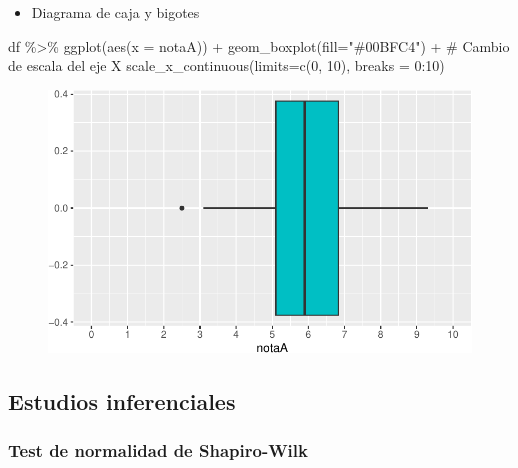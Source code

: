 \documentclass[
  a4paper,
]{scrreport}
\newenvironment{Shaded}{\begin{snugshade}}{\end{snugshade}}
\newcommand{\AttributeTok}[1]{\textcolor[rgb]{0.40,0.45,0.13}{#1}}
\newcommand{\CommentTok}[1]{\textcolor[rgb]{0.37,0.37,0.37}{#1}}
\newcommand{\DecValTok}[1]{\textcolor[rgb]{0.68,0.00,0.00}{#1}}
\newcommand{\FunctionTok}[1]{\textcolor[rgb]{0.28,0.35,0.67}{#1}}
\newcommand{\NormalTok}[1]{\textcolor[rgb]{0.00,0.23,0.31}{#1}}
\newcommand{\SpecialCharTok}[1]{\textcolor[rgb]{0.37,0.37,0.37}{#1}}
\newcommand{\StringTok}[1]{\textcolor[rgb]{0.13,0.47,0.30}{#1}}
\providecommand{\tightlist}{%
  \setlength{\itemsep}{0pt}\setlength{\parskip}{0pt}}\usepackage{longtable,booktabs,array}
\theoremstyle{definition}
\theoremstyle{definition}
\theoremstyle{remark}
\begin{document}
\begin{itemize}
\tightlist
\item
  Diagrama de caja y bigotes
\end{itemize}

\begin{Shaded}
\begin{Highlighting}[]
\NormalTok{df }\SpecialCharTok{\%\textgreater{}\%} \FunctionTok{ggplot}\NormalTok{(}\FunctionTok{aes}\NormalTok{(}\AttributeTok{x =}\NormalTok{ notaA)) }\SpecialCharTok{+} 
  \FunctionTok{geom\_boxplot}\NormalTok{(}\AttributeTok{fill=}\StringTok{"\#00BFC4"}\NormalTok{) }\SpecialCharTok{+}
  \CommentTok{\# Cambio de escala del eje X}
  \FunctionTok{scale\_x\_continuous}\NormalTok{(}\AttributeTok{limits=}\FunctionTok{c}\NormalTok{(}\DecValTok{0}\NormalTok{, }\DecValTok{10}\NormalTok{), }\AttributeTok{breaks =} \DecValTok{0}\SpecialCharTok{:}\DecValTok{10}\NormalTok{)}
\end{Highlighting}
\end{Shaded}

\begin{figure}[H]

{\centering \includegraphics{./08-analisis-estadisticos_files/figure-pdf/unnamed-chunk-15-1.pdf}

}

\end{figure}

\hypertarget{estudios-inferenciales}{%
\subsection{Estudios inferenciales}\label{estudios-inferenciales}}

\hypertarget{test-de-normalidad-de-shapiro-wilk}{%
\subsubsection{Test de normalidad de
Shapiro-Wilk}\label{test-de-normalidad-de-shapiro-wilk}}
\end{document}
